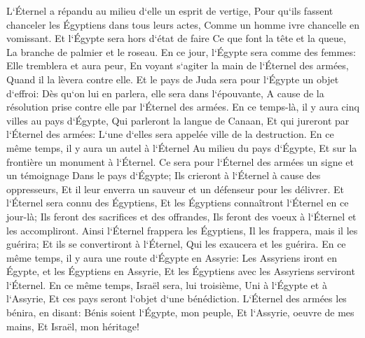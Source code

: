 \verse L`Éternel a répandu au milieu d`elle un esprit de vertige, Pour qu`ils fassent chanceler les Égyptiens dans tous leurs actes, Comme un homme ivre chancelle en vomissant. 
\verse Et l`Égypte sera hors d`état de faire Ce que font la tête et la queue, La branche de palmier et le roseau. 
\verse En ce jour, l`Égypte sera comme des femmes: Elle tremblera et aura peur, En voyant s`agiter la main de l`Éternel des armées, Quand il la lèvera contre elle. 
\verse Et le pays de Juda sera pour l`Égypte un objet d`effroi: Dès qu`on lui en parlera, elle sera dans l`épouvante, A cause de la résolution prise contre elle par l`Éternel des armées. 
\verse En ce temps-là, il y aura cinq villes au pays d`Égypte, Qui parleront la langue de Canaan, Et qui jureront par l`Éternel des armées: L`une d`elles sera appelée ville de la destruction. 
\verse En ce même temps, il y aura un autel à l`Éternel Au milieu du pays d`Égypte, Et sur la frontière un monument à l`Éternel. 
\verse Ce sera pour l`Éternel des armées un signe et un témoignage Dans le pays d`Égypte; Ils crieront à l`Éternel à cause des oppresseurs, Et il leur enverra un sauveur et un défenseur pour les délivrer. 
\verse Et l`Éternel sera connu des Égyptiens, Et les Égyptiens connaîtront l`Éternel en ce jour-là; Ils feront des sacrifices et des offrandes, Ils feront des voeux à l`Éternel et les accompliront. 
\verse Ainsi l`Éternel frappera les Égyptiens, Il les frappera, mais il les guérira; Et ils se convertiront à l`Éternel, Qui les exaucera et les guérira. 
\verse En ce même temps, il y aura une route d`Égypte en Assyrie: Les Assyriens iront en Égypte, et les Égyptiens en Assyrie, Et les Égyptiens avec les Assyriens serviront l`Éternel. 
\verse En ce même temps, Israël sera, lui troisième, Uni à l`Égypte et à l`Assyrie, Et ces pays seront l`objet d`une bénédiction. 
\verse L`Éternel des armées les bénira, en disant: Bénis soient l`Égypte, mon peuple, Et l`Assyrie, oeuvre de mes mains, Et Israël, mon héritage! 

